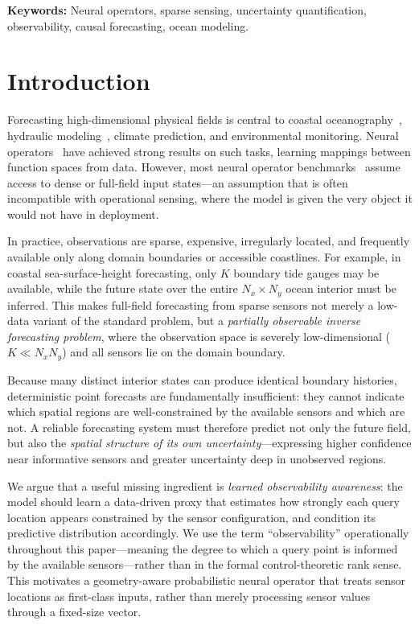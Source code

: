 \documentclass[11pt,a4paper]{article}
\begin{document}
\vspace{8pt}

\noindent\textbf{Keywords:} Neural operators, sparse sensing, uncertainty quantification, observability, causal forecasting, ocean modeling.


\section{Introduction}

Forecasting high-dimensional physical fields is central to coastal oceanography~\cite{xu2024coastal, lellouche2018cmems}, hydraulic modeling~\cite{liu2026physics}, climate prediction, and environmental monitoring. Neural operators~\cite{li2021fno, lu2021deeponet} have achieved strong results on such tasks, learning mappings between function spaces from data. However, most neural operator benchmarks~\cite{takamoto2022pdebench} assume access to dense or full-field input states---an assumption that is often incompatible with operational sensing, where the model is given the very object it would not have in deployment.

In practice, observations are sparse, expensive, irregularly located, and frequently available only along domain boundaries or accessible coastlines. For example, in coastal sea-surface-height forecasting, only $K$ boundary tide gauges may be available, while the future state over the entire $N_x \times N_y$ ocean interior must be inferred. This makes full-field forecasting from sparse sensors not merely a low-data variant of the standard problem, but a \emph{partially observable inverse forecasting problem}, where the observation space is severely low-dimensional ($K \ll N_x N_y$) and all sensors lie on the domain boundary.

Because many distinct interior states can produce identical boundary histories, deterministic point forecasts are fundamentally insufficient: they cannot indicate which spatial regions are well-constrained by the available sensors and which are not. A reliable forecasting system must therefore predict not only the future field, but also the \emph{spatial structure of its own uncertainty}---expressing higher confidence near informative sensors and greater uncertainty deep in unobserved regions.

We argue that a useful missing ingredient is \emph{learned observability awareness}: the model should learn a data-driven proxy that estimates how strongly each query location appears constrained by the sensor configuration, and condition its predictive distribution accordingly. We use the term ``observability'' operationally throughout this paper---meaning the degree to which a query point is informed by the available sensors---rather than in the formal control-theoretic rank sense. This motivates a geometry-aware probabilistic neural operator that treats sensor locations as first-class inputs, rather than merely processing sensor values through a fixed-size vector.
\end{document}
